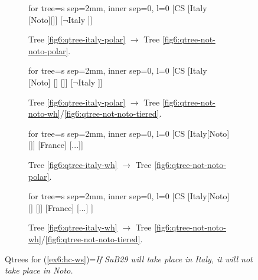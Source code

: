 \begin{figure}[H]
\setlength{\fboxsep}{1pt}
\renewcommand\thefigure{\ref{fig6:qtrees-hc-ws}}
\centering
\begin{subfigure}[b]{.23\linewidth}
	\centering
	\scalebox{.8}
	{\begin{forest}for tree={s sep=2mm, inner sep=0, l=0}
			[CS [{Italy} [Noto][]] [{$\neg$Italy} ]]
	\end{forest}}
	\caption{Tree \ref{fig6:qtree-italy-polar} $\rightarrow$ Tree \ref{fig6:qtree-not-noto-polar}.}\label{ex6:qtree-if-italy-not-noto-polar-polar-2}
\end{subfigure}\hfill
\begin{subfigure}[b]{.25\linewidth}
	\centering
	\scalebox{.8}
	{\begin{forest}for tree={s sep=2mm, inner sep=0, l=0}
			[CS [{Italy} [{Noto}] [] []] [{$\neg$Italy} ]]
	\end{forest}}
	\caption{Tree \ref{fig6:qtree-italy-polar} $\rightarrow$ Tree \ref{fig6:qtree-not-noto-wh}/\ref{fig6:qtree-not-noto-tiered}.}\label{ex6:qtree-if-italy-not-noto-polar-wh-2}
\end{subfigure}
\hfill
\begin{subfigure}[b]{.25\linewidth}
	\centering
	\scalebox{.8}
	{\begin{forest}for tree={s sep=2mm, inner sep=0, l=0}
			[CS [Italy[Noto][]] [France] [...]]
	\end{forest}}
	\caption{Tree \ref{fig6:qtree-italy-wh} $\rightarrow$ Tree \ref{fig6:qtree-not-noto-polar}.}\label{ex6:qtree-if-italy-not-noto-wh-polar-2}
\end{subfigure}\hfill
\begin{subfigure}[b]{.25\linewidth}
	\centering
	\scalebox{.8}
	{\begin{forest}for tree={s sep=2mm, inner sep=0, l=0}
			[CS [Italy[{Noto}] [] []] [France] [...] ]
	\end{forest}}
	\caption{Tree \ref{fig6:qtree-italy-wh} $\rightarrow$ Tree \ref{fig6:qtree-not-noto-wh}/\ref{fig6:qtree-not-noto-tiered}.}\label{ex6:qtree-if-italy-not-noto-wh-wh-2}
\end{subfigure}
\caption{Qtrees for (\ref{ex6:hc-ws})=\textit{If SuB29 will take place in Italy, it will not take place in Noto.}}\label{ex6:qtree-if-italy-not-noto-2}
\end{figure}

